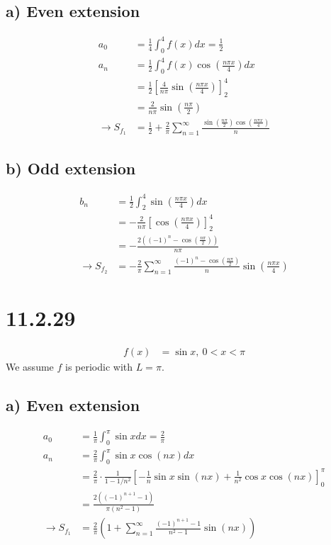\documentclass[11pt,a4paper]{article}
\begin{document}
\subsection*{a) Even extension}
\begin{align*}
    a_0 &= \frac{1}{4} \int_0^4 f(x)dx = \frac{1}{2} \\
    a_n &= \frac{1}{2} \int_0^4 f(x)\cos\left(\frac{n\pi x}{4}\right)dx \\
    &= \frac{1}{2} \left[
        \frac{4}{n\pi}\sin\left(\frac{n\pi x}{4}\right)
    \right]_2^4 \\
    &= \frac{2}{n\pi}\sin\left(\frac{n\pi}{2}\right) \\
    \rightarrow S_{f_1}
    &= \frac{1}{2} + \frac{2}{\pi}\sum_{n=1}^\infty \frac{
        \sin\left(\frac{n\pi}{2}\right) \cos\left(\frac{n\pi x}{4}\right)
    }{n}
\end{align*}

\subsection*{b) Odd extension}
\begin{align*}
    b_n &= \frac{1}{2} \int_2^4 \sin\left(\frac{n\pi x}{4}\right)dx \\
    &= - \frac{2}{n\pi} [\cos\left(\frac{n\pi x}{4}\right)]_2^4 \\
    &= - \frac{2 ((-1)^n - \cos\left(\frac{n\pi}{2}\right))}{n\pi} \\
    \rightarrow S_{f_2}
    &= - \frac{2}{\pi}\sum_{n=1}^\infty \frac{(-1)^n - \cos\left(\frac{n\pi}{2}\right)}{n} \sin\left(\frac{n\pi x }{4}\right)
\end{align*}

\newpage
\section*{11.2.29}
\begin{align*}
    f(x) &= \sin x,\ 0<x<\pi
\end{align*}
We assume $f$ is periodic with $L = \pi$.
\subsection*{a) Even extension}
\begin{align*}
    a_0 &= \frac{1}{\pi} \int_0^\pi \sin x dx = \frac{2}{\pi} \\
    a_n &= \frac{2}{\pi} \int_0^\pi \sin x \cos(nx)dx \\
    &= \frac{2}{\pi} \cdot \frac{1}{1-1/n^2}\left[
        -\frac{1}{n} \sin x \sin(nx) + \frac{1}{n^2}\cos x \cos(nx)
    \right]_0^\pi \\
    &= \frac{2((-1)^{n+1} -1)}{\pi(n^2-1)} \\
    \rightarrow S_{f_1} 
    &= \frac{2}{\pi} \left(
        1 + \sum_{n=1}^\infty \frac{(-1)^{n+1} -1}{n^2-1} \sin(nx)
    \right)
\end{align*}
\end{document}
